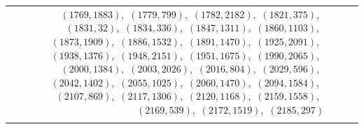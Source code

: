 \documentclass[11pt]{article}
\begin{document}
\begin{longtable}{@{}rrl>{\raggedright\arraybackslash}p{}@{}}
$(1769,1883)$,\allowbreak\ $(1779,799)$,\allowbreak\ $(1782,2182)$,\allowbreak\ $(1821,375)$,\allowbreak\ $(1831,32)$,\allowbreak\ $(1834,336)$,\allowbreak\ $(1847,1311)$,\allowbreak\ $(1860,1103)$,\allowbreak\ $(1873,1909)$,\allowbreak\ $(1886,1532)$,\allowbreak\ $(1891,1470)$,\allowbreak\ $(1925,2091)$,\allowbreak\ $(1938,1376)$,\allowbreak\ $(1948,2151)$,\allowbreak\ $(1951,1675)$,\allowbreak\ $(1990,2065)$,\allowbreak\ $(2000,1384)$,\allowbreak\ $(2003,2026)$,\allowbreak\ $(2016,804)$,\allowbreak\ $(2029,596)$,\allowbreak\ $(2042,1402)$,\allowbreak\ $(2055,1025)$,\allowbreak\ $(2060,1470)$,\allowbreak\ $(2094,1584)$,\allowbreak\ $(2107,869)$,\allowbreak\ $(2117,1306)$,\allowbreak\ $(2120,1168)$,\allowbreak\ $(2159,1558)$,\allowbreak\ $(2169,539)$,\allowbreak\ $(2172,1519)$,\allowbreak\ $(2185,297)$\\
\addlinespace[3pt]
\end{longtable}
\endgroup
\end{document}
